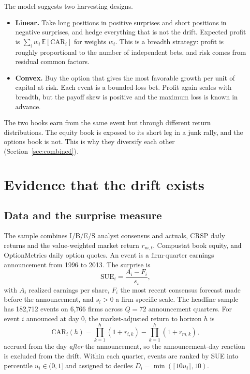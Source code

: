 \documentclass[11pt]{article}
\theoremstyle{definition}
\newcommand{\E}{\mathbb{E}}
\newcommand{\1}{\mathbf{1}}
\begin{document}
The model suggests two harvesting designs.
\begin{itemize}
  \item \textbf{Linear.} Take long positions in positive surprises and short positions in
        negative surprises, and hedge everything that is not the drift. Expected profit is
        $\sum_i w_i\,\E[\mathrm{CAR}_i]$ for weights $w_i$. This is a breadth strategy:
        profit is roughly proportional to the number of independent bets, and risk comes
        from residual common factors.
  \item \textbf{Convex.} Buy the option that gives the most favorable growth per unit of
        capital at risk. Each event is a bounded-loss bet. Profit again scales with breadth,
        but the payoff skew is positive and the maximum loss is known in advance.
\end{itemize}
The two books earn from the same event but through different return distributions. The
equity book is exposed to its short leg in a junk rally, and the options book is not. This
is why they diversify each other (Section~\ref{sec:combined}).

\section{Evidence that the drift exists}\label{sec:evidence}

\subsection{Data and the surprise measure}

The sample combines I/B/E/S analyst consensus and actuals, CRSP daily returns and the
value-weighted market return $r_{m,t}$, Compustat book equity, and OptionMetrics daily option
quotes. An event is a firm-quarter earnings announcement from 1996 to 2013. The surprise is
\begin{equation}
  \mathrm{SUE}_i=\frac{A_i-F_i}{s_i},
\end{equation}
with $A_i$ realized earnings per share, $F_i$ the most recent consensus forecast made before the
announcement, and $s_i>0$ a firm-specific scale. The headline sample has 182{,}712 events on
6{,}766 firms across $Q=72$ announcement quarters. For event $i$ announced at day $0$, the
market-adjusted return to horizon $h$ is
\[
  \mathrm{CAR}_i(h)=\prod_{k=1}^{h}(1+r_{i,k})-\prod_{k=1}^{h}(1+r_{m,k}),
\]
accrued from the day \emph{after} the announcement, so the announcement-day reaction is
excluded from the drift. Within each quarter, events are ranked by SUE into percentile
$u_i\in(0,1]$ and assigned to deciles $D_i=\min(\lceil10u_i\rceil,10)$.
\end{document}
